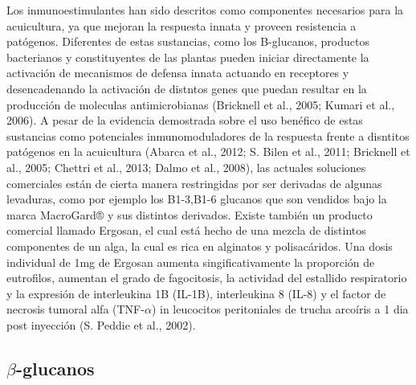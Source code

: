 \documentclass[12pt,a4paper,oneside]{scrbook}
\begin{document}
Los inmunoestimulantes han sido descritos como componentes necesarios
para la acuicultura, ya que mejoran la respuesta innata y proveen
resistencia a patógenos. Diferentes de estas sustancias, como los
B-glucanos, productos bacterianos y constituyentes de las plantas pueden
iniciar directamente la activación de mecanismos de defensa innata
actuando en receptores y desencadenando la activación de distntos genes
que puedan resultar en la producción de moleculas antimicrobianas
(Bricknell et al., 2005; Kumari et al., 2006). A pesar de la evidencia
demostrada sobre el uso benéfico de estas sustancias como potenciales
inmunomoduladores de la respuesta frente a disntitos patógenos en la
acuicultura (Abarca et al., 2012; S. Bilen et al., 2011; Bricknell et
al., 2005; Chettri et al., 2013; Dalmo et al., 2008), las actuales
soluciones comerciales están de cierta manera restringidas por ser
derivadas de algunas levaduras, como por ejemplo los B1-3,B1-6 glucanos
que son vendidos bajo la marca MacroGard® y sus distintos derivados.
Existe también un producto comercial llamado Ergosan, el cual está hecho
de una mezcla de distintos componentes de un alga, la cual es rica en
alginatos y polisacáridos. Una dosis individual de 1mg de Ergosan
aumenta singificativamente la proporción de eutrofilos, aumentan el
grado de fagocitosis, la actividad del estallido respiratorio y la
expresión de interleukina 1B (IL-1B), interleukina 8 (IL-8) y el factor
de necrosis tumoral alfa (TNF-$\alpha$) in leucocitos peritoniales de
trucha arcoíris a 1 dia post inyección (S. Peddie et al., 2002).

\subsection{$\beta$-glucanos}
\end{document}
